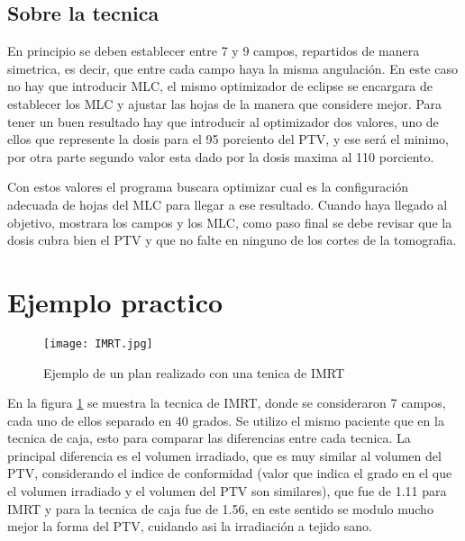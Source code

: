 \documentclass{article}
\begin{document}
\subsection{Sobre la tecnica}

En principio se deben establecer entre 7 y 9 campos, repartidos de manera simetrica, es decir, que entre cada campo haya la misma angulación. En este caso no hay que introducir MLC, el mismo optimizador de eclipse se encargara de establecer los MLC y ajustar las hojas de la manera que considere mejor. Para tener un buen resultado hay que introducir al optimizador dos valores, uno de ellos que represente la dosis para el 95 porciento del PTV, y ese será el minimo, por otra parte segundo valor esta dado por la dosis maxima al 110 porciento.

\vspace{10pt}

Con estos valores el programa buscara optimizar cual es la configuración adecuada de hojas del MLC para llegar a ese resultado. Cuando haya llegado al objetivo, mostrara los campos y los MLC, como paso final se debe revisar que la dosis cubra bien el PTV y que no falte en ninguno de los cortes de la tomografia.

\section{Ejemplo practico}


\begin{figure}[h!]
    \centering
    \texttt{[image: IMRT.jpg]}
    \caption{Ejemplo de un plan realizado con una tenica de IMRT}
    \label{a5}
\end{figure}



En la figura \ref{a5} se muestra la tecnica de IMRT, donde se consideraron 7 campos, cada uno de ellos separado en 40 grados. Se utilizo el mismo paciente que en la tecnica de caja, esto para comparar las diferencias entre cada tecnica. La principal diferencia es el volumen irradiado, que es muy similar al volumen del PTV, considerando el indice de conformidad (valor que indica el grado en el que el volumen irradiado y el volumen del PTV son similares), que fue de 1.11 para IMRT y para la tecnica de caja fue de 1.56, en este sentido se modulo mucho mejor la forma del PTV, cuidando asi la irradiación a tejido sano. 
\end{document}
